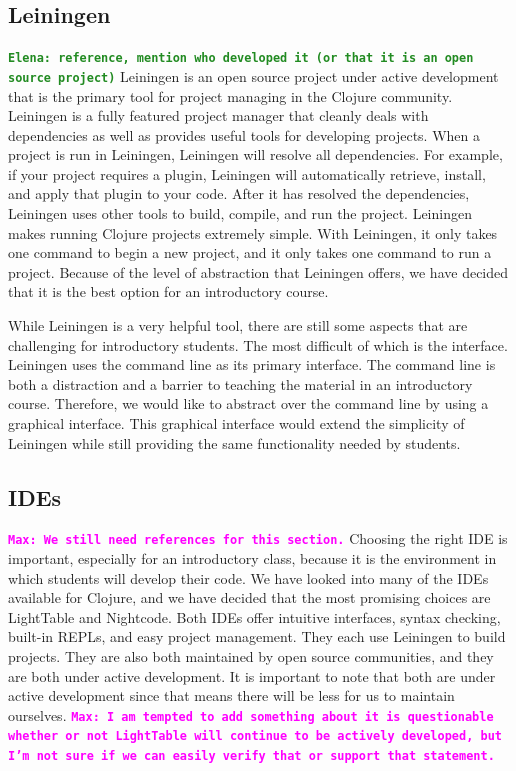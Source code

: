 \documentclass[12pt]{article}
\newcommand{\comment}[1]{{\bf \tt  {#1}}}
\newcommand{\emcomment}[1]{\textcolor{ForestGreen}{\comment{Elena: {#1}}}}
\newcommand{\mmcomment}[1]{\textcolor{magenta}{\comment{Max: {#1}}}}
\begin{document}
\subsection{Leiningen}
\emcomment{reference, mention who developed it (or that it is an open source project)}
Leiningen is an open source project under active development that is the primary tool for project managing in the Clojure community\cite{LeinGitHub}. Leiningen is a fully featured project manager that cleanly deals with dependencies as well as provides useful tools for developing projects. When a project is run in Leiningen, Leiningen will resolve all dependencies. For example, if your project requires a plugin, Leiningen will automatically retrieve, install, and apply that plugin to your code. After it has resolved the dependencies, Leiningen uses other tools to build, compile, and run the project. Leiningen makes running Clojure projects extremely simple. With Leiningen, it only takes one command to begin a new project, and it only takes one command to run a project. Because of the level of abstraction that Leiningen offers, we have decided that it is the best option for an introductory course.

While Leiningen is a very helpful tool, there are still some aspects that are challenging for introductory students. The most difficult of which is the interface. Leiningen uses the command line as its primary interface. The command line is both a distraction and a barrier to teaching the material in an introductory course. Therefore, we would like to abstract over the command line by using a graphical interface. This graphical interface would extend the simplicity of Leiningen while still providing the same functionality needed by students.

\subsection{IDEs}
\mmcomment{We still need references for this section.}
Choosing the right IDE is important, especially for an introductory class, because it is the environment in which students will develop their code. We have looked into many of the IDEs available for Clojure, and we have decided that the most promising choices are LightTable and Nightcode. Both IDEs offer intuitive interfaces, syntax checking, built-in REPLs, and easy project management. They each use Leiningen to build projects. They are also both maintained by open source communities, and they are both under active development. It is important to note that both are under active development since that means there will be less for us to maintain ourselves. \mmcomment{I am tempted to add something about it is questionable whether or not LightTable will continue to be actively developed, but I'm not sure if we can easily verify that or support that statement.}
\end{document}

